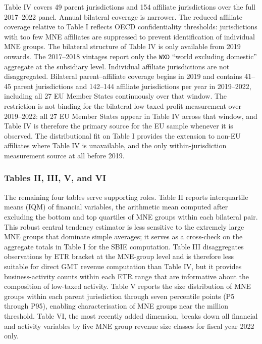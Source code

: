 \documentclass[11pt,a4paper]{article}
\newcommand{\EUR}{\texteuro}
\newcommand{\code}[1]{\texttt{#1}}
\begin{document}
Table IV covers 49 parent jurisdictions and 154 affiliate jurisdictions over the full 2017--2022 panel. Annual bilateral coverage is narrower. The reduced affiliate coverage relative to Table I reflects OECD confidentiality thresholds: jurisdictions with too few MNE affiliates are suppressed to prevent identification of individual MNE groups. The bilateral structure of Table IV is only available from 2019 onwards. The 2017--2018 vintages report only the \code{WXD} ``world excluding domestic'' aggregate at the subsidiary level. Individual affiliate jurisdictions are not disaggregated. Bilateral parent--affiliate coverage begins in 2019 and contains 41--45 parent jurisdictions and 142--144 affiliate jurisdictions per year in 2019--2022, including all 27 EU Member States continuously over that window. The restriction is not binding for the bilateral low-taxed-profit measurement over 2019--2022: all 27 EU Member States appear in Table IV across that window, and Table IV is therefore the primary source for the EU sample whenever it is observed. The distributional fit on Table I provides the extension to non-EU affiliates where Table IV is unavailable, and the only within-jurisdiction measurement source at all before 2019.

\subsubsection{Tables II, III, V, and VI}\label{sec:other_tables}

The remaining four tables serve supporting roles. Table II reports interquartile means (IQM) of financial variables, the arithmetic mean computed after excluding the bottom and top quartiles of MNE groups within each bilateral pair. This robust central tendency estimator is less sensitive to the extremely large MNE groups that dominate simple averages; it serves as a cross-check on the aggregate totals in Table I for the SBIE computation. Table III disaggregates observations by ETR bracket at the MNE-group level and is therefore less suitable for direct GMT revenue computation than Table IV, but it provides business-activity counts within each ETR range that are informative about the composition of low-taxed activity. Table V reports the size distribution of MNE groups within each parent jurisdiction through seven percentile points (P5 through P95), enabling characterisation of MNE groups near the \EUR750 million threshold. Table VI, the most recently added dimension, breaks down all financial and activity variables by five MNE group revenue size classes for fiscal year 2022 only.
\end{document}
